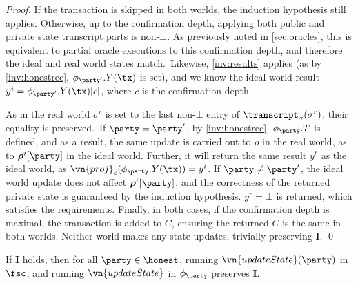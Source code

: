 \begin{proof}
  If the transaction is skipped in both worlds, the induction hypothesis still
  applies. Otherwise, up to the confirmation depth, applying both public
    and private state transcript parts is non-$\bot$. As previously
  noted in \autoref{sec:oracles}, this is equivalent to partial oracle
    executions to this confirmation depth, and therefore the ideal and real
    world states match.\ Likewise, \ref{inv:results} applies (as by \ref{inv:honestrec},
  $\phi_{\party'}.Y(\tx)$ is set), and we know the ideal-world result $y^i =
  \phi_{\party'}.Y(\tx)[c]$, where $c$ is the
    confirmation depth.

  As in the real world $\sigma^r$ is set to the last non-$\bot$ entry of $\transcript_\sigma(\sigma^r)$, their
  equality is preserved.\ If $\party = \party'$, by \ref{inv:honestrec},
  $\phi_\party.T$ is defined, and as a result, the same update is carried out to
  $\rho$ in the real world, as to $\boldsymbol\rho^i[\party]$ in the ideal
  world. Further, it will return the same result $y^r$ as the ideal world, as
  $\vn{proj}_c(\phi_\party.Y(\tx)) = y^i$. If $\party \neq \party'$, the ideal world update
  does not affect $\boldsymbol\rho^i[\party]$, and the correctness of the
  returned private state is guaranteed by the induction hypothesis. $y^r = \bot$
  is returned, which satisfies the requirements. Finally, in both cases,
  if the confirmation depth is maximal, the transaction is added to $C$, ensuring the returned $C$ is
  the same in both worlds. Neither world makes any state updates, trivially
  preserving $\boldsymbol I$.
  \qed
\end{proof}

\begin{lemma}
  \sloppy
  If $\boldsymbol I$ holds, then for all $\party \in \honest$, running
  $\vn{updateState}(\party)$ in $\fsc$, and running $\vn{updateState}$
  in $\phi_\party$ preserves $\boldsymbol I$.
  \label{lem:updatestate}
\end{lemma}

